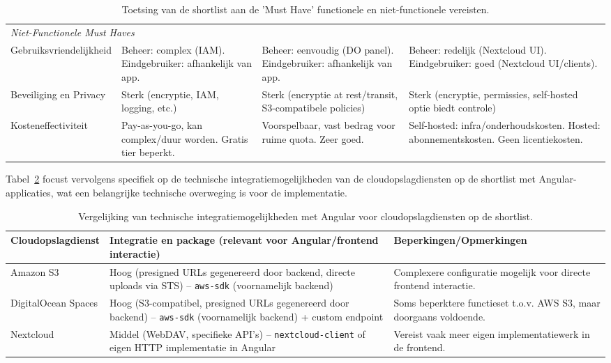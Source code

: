 \begin{table}[H]
\begin{tabularx}{\textwidth}{l >{\raggedright\arraybackslash}X >{\raggedright\arraybackslash}X >{\raggedright\arraybackslash}X}
      \midrule
      \multicolumn{4}{l}{\textit{Niet-Functionele Must Haves}} \\
      Gebruiksvriendelijkheid & Beheer: complex (IAM). Eindgebruiker: afhankelijk van app. & Beheer: eenvoudig (DO panel). Eindgebruiker: afhankelijk van app. & Beheer: redelijk (Nextcloud UI). Eindgebruiker: goed (Nextcloud UI/clients). \\
      \midrule
      Beveiliging en Privacy & Sterk (encryptie, IAM, logging, etc.) & Sterk (encryptie at rest/transit, S3-compatibele policies) & Sterk (encryptie, permissies, self-hosted optie biedt controle) \\
      \midrule
      Kosteneffectiviteit & Pay-as-you-go, kan complex/duur worden. Gratis tier beperkt. & Voorspelbaar, vast bedrag voor ruime quota. Zeer goed. & Self-hosted: infra/onderhoudskosten. Hosted: abonnementskosten. Geen licentiekosten. \\
      \bottomrule
    \end{tabularx}
    \caption[Toetsing shortlist aan Must Have vereisten]{\label{tab:musthave-vergelijking}Toetsing van de shortlist aan de 'Must Have' functionele en niet-functionele vereisten.}
\end{table}

Tabel~\ref{tab:cloud-integratie-vergelijking-angular} focust vervolgens specifiek op de technische integratiemogelijkheden van de cloudopslagdiensten op de shortlist met Angular-applicaties, wat een belangrijke technische overweging is voor de implementatie.

\begin{table}[H]
    \centering
    \footnotesize
    \begin{tabularx}{\textwidth}{lXX}
        \toprule
        \textbf{Cloudopslagdienst} & \textbf{Integratie en package (relevant voor Angular/frontend interactie)} & \textbf{Beperkingen/Opmerkingen} \\
        \midrule
        Amazon S3 & Hoog (presigned URLs gegenereerd door backend, directe uploads via STS) – \texttt{aws-sdk} (voornamelijk backend) & Complexere configuratie mogelijk voor directe frontend interactie. \\
        DigitalOcean Spaces & Hoog (S3-compatibel, presigned URLs gegenereerd door backend) – \texttt{aws-sdk} (voornamelijk backend) + custom endpoint & Soms beperktere functieset t.o.v. AWS S3, maar doorgaans voldoende. \\
        Nextcloud & Middel (WebDAV, specifieke API's) – \texttt{nextcloud-client} of eigen HTTP implementatie in Angular & Vereist vaak meer eigen implementatiewerk in de frontend. \\
        \bottomrule
    \end{tabularx}
    \caption[Vergelijking technische integratiemogelijkheden met Angular]{\label{tab:cloud-integratie-vergelijking-angular}Vergelijking van technische integratiemogelijkheden met Angular voor cloudopslagdiensten op de shortlist.}
\end{table}

